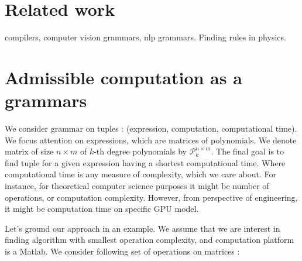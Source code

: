 \documentclass{article}
\begin{document}
\section{Related work} \label{relatedwork}

compilers, computer vision grammars, nlp grammars. Finding rules in physics.

\section{Admissible computation as a grammars}\label{sec:grammars}

We consider grammar on tuples : (expression, computation, computational time).
We focus attention on expressions, which are matrices of polynomials. We denote
matrix of size $n \times m$ of $k$-th degree polynomials by $\mathcal{P}^{n
\times m}_k$.  The final goal is to find tuple for a given expression having
a shortest computational time. Where computational time is any measure of
complexity, which we care about. For instance, for theoretical computer science
purposes it might be number of operations, or computation complexity. However,
from perspective of engineering, it might be computation time on specific GPU
model. 


Let's ground our approach in an example. We assume that we are interest in
finding algorithm with smallest operation complexity, and computation platform
is a Matlab.  We consider following set of operations on matrices : 
\end{document}
